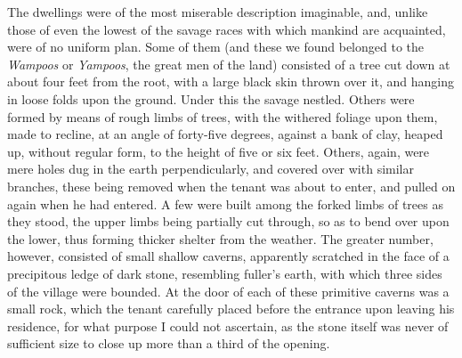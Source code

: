 The dwellings were of the most miserable description imaginable, and, unlike
those of even the lowest of the savage races with which mankind are acquainted,
were of no uniform plan. Some of them (and these we found belonged to the
\emph{Wampoos} or \emph{Yampoos}, the great men of the land) consisted of a tree
cut down at about four feet from the root, with a large black skin thrown over
it, and hanging in loose folds upon the ground. Under this the savage nestled.
Others were formed by means of rough limbs of trees, with the withered foliage
upon them, made to recline, at an angle of forty-five degrees, against a bank of
clay, heaped up, without regular form, to the height of five or six feet.
Others, again, were mere holes dug in the earth perpendicularly, and covered
over with similar branches, these being removed when the tenant was about to
enter, and pulled on again when he had entered. A few were built among the
forked limbs of trees as they stood, the upper limbs being partially cut
through, so as to bend over upon the lower, thus forming thicker shelter from
the weather. The greater number, however, consisted of small shallow caverns,
apparently scratched in the face of a precipitous ledge of dark stone,
resembling fuller's earth, with which three sides of the village were bounded.
At the door of each of these primitive caverns was a small rock, which the
tenant carefully placed before the entrance upon leaving his residence, for what
purpose I could not ascertain, as the stone itself was never of sufficient size
to close up more than a third of the opening. 


